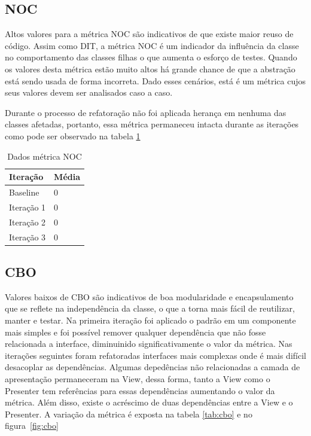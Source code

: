 \subsection{NOC}

Altos valores para a métrica NOC são indicativos de que existe maior reuso de
código. Assim como DIT, a métrica NOC é um indicador da influência da classe
no comportamento das classes filhas o que aumenta o esforço de testes. Quando os
valores desta métrica estão muito altos há grande chance de que a abstração está
sendo usada de forma incorreta. Dado esses cenários, está é um métrica cujos
seus valores devem ser analisados caso a caso.

Durante o processo de refatoração não foi aplicada herança em nenhuma das
classes afetadas, portanto, essa métrica permaneceu intacta durante as iterações
como pode ser observado na tabela \ref{tab:noc} %

\begin{table}[h]
	\centering
	    \caption{Dados métrica NOC}
    \begin{tabular}{ | l | l | }
    \hline
    Iteração & Média 			\\ \hline
    Baseline & 0  	\\ \hline
    Iteração 1 & 0			\\ \hline
	Iteração 2 & 0				\\ \hline
	Iteração 3 & 0	\\ \hline
    \end{tabular}
    \label{tab:noc}
\end{table}


\subsection{CBO}

Valores baixos de CBO são indicativos de boa modularidade e encapsulamento que
se reflete na independência da classe, o que a torna mais fácil de reutilizar,
manter e testar.
Na primeira iteração foi aplicado o padrão em um componente mais simples e foi
possível remover qualquer dependência que não fosse relacionada a interface,
diminuinido significativamente o valor da métrica. Nas iterações seguintes foram
refatoradas interfaces mais complexas onde é mais difícil desacoplar as
dependências. Algumas depedências não relacionadas a camada de apresentação
permaneceram na View, dessa forma, tanto a View como o Presenter tem referências
para essas dependências aumentando o valor da métrica. Além disso, existe o
acréscimo de duas dependências entre a View e o Presenter. A variação da métrica
é exposta na tabela \ref{tab:cbo} e no figura~\ref{fig:cbo}

